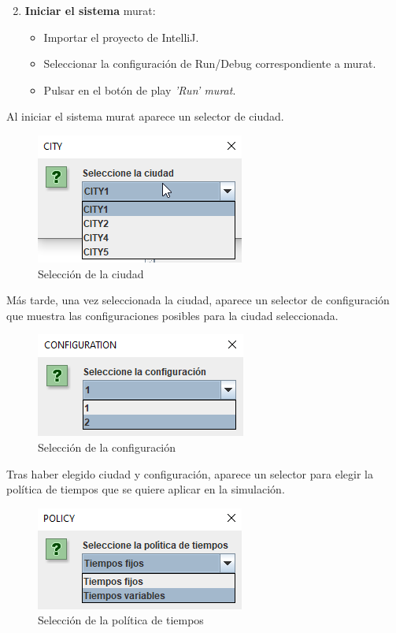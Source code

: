 \begin{enumerate}
    \setcounter{enumi}{1}
    \item \textbf{Iniciar el sistema} \acrshort{murat}:
    \begin{itemize}
        \item Importar el proyecto de IntelliJ.
        \item Seleccionar la configuración de Run/Debug correspondiente a \acrshort{murat}.
        \item Pulsar en el botón de play \textit{'Run' \acrshort{murat}}.
    \end{itemize}
\end{enumerate}

Al iniciar el sistema \acrshort{murat} aparece un selector de ciudad.
\begin{figure}[H]
    \centering
    \includegraphics[width=0.5\linewidth]{text/image/Ejec_CITY.png}
    \caption{Selección de la ciudad}
    \label{fig:ejec_city}
\end{figure}

Más tarde, una vez seleccionada la ciudad, aparece un selector de configuración que muestra las configuraciones posibles para la ciudad seleccionada.
\begin{figure}[H]
    \centering
    \includegraphics[width=0.5\linewidth]{text/image/Ejec_CONFIGURATION.png}
    \caption{Selección de la configuración}
    \label{fig:ejec_configuracion}
\end{figure}

Tras haber elegido ciudad y configuración, aparece un selector para elegir la política de tiempos que se quiere aplicar en la simulación.
\begin{figure}[H]
    \centering
    \includegraphics[width=0.5\linewidth]{text/image/Ejec_POLICY.png}
    \caption{Selección de la política de tiempos}
    \label{fig:ejec_policy}
\end{figure}

